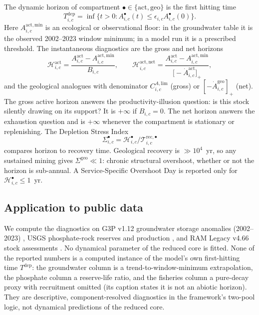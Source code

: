\documentclass[11pt]{article}
\theoremstyle{definition}
\begin{document}
The dynamic horizon of compartment $\bullet\in\{\mathrm{act},\mathrm{geo}\}$ is the first hitting time
\begin{equation}
T^{\mathrm{dep}}_{i,c}=\inf\bigl\{t>0:A^\bullet_{i,c}(t)\le\epsilon_{i,c}A^\bullet_{i,c}(0)\bigr\}.
\end{equation}
Here $A^{\mathrm{act,min}}_{i,c}$ is an ecological or observational floor: in the groundwater table it is the observed 2002--2023 window minimum; in a model run it is a prescribed threshold. The instantaneous diagnostics are the gross and net horizons
\begin{equation}
\mathcal H^{\mathrm{act}}_{i,c}=\frac{A^{\mathrm{act}}_{i,c}-A^{\mathrm{act,min}}_{i,c}}{B_{i,c}},
\qquad
\mathcal H^{\mathrm{act,net}}_{i,c}=\frac{A^{\mathrm{act}}_{i,c}-A^{\mathrm{act,min}}_{i,c}}{\bigl[-\dot A^{\mathrm{act}}_{i,c}\bigr]_+},
\end{equation}
and the geological analogues with denominator $C^{A,\mathrm{lim}}_{i,c}$ (gross) or $[-\dot A^{\mathrm{geo}}_{i,c}]_+$ (net). The gross active horizon answers the productivity-illusion question: is this stock silently drawing on its support? It is $+\infty$ if $B_{i,c}=0$. The net horizon answers the exhaustion question and is $+\infty$ whenever the compartment is stationary or replenishing. The Depletion Stress Index
\begin{equation}
\Sigma^\bullet_{i,c}=\mathcal H^\bullet_{i,c}/\mathcal T^{\mathrm{rec},\bullet}_{i,c}
\end{equation}
compares horizon to recovery time. Geological recovery is $\gg 10^4$~yr, so any sustained mining gives $\Sigma^{\mathrm{geo}}\ll 1$: chronic structural overshoot, whether or not the horizon is sub-annual. A Service-Specific Overshoot Day is reported only for $\mathcal H^\bullet_{i,c}\le 1$~yr.

\subsection{Application to public data}
\label{sec:adh-results}

We compute the diagnostics on G3P v1.12 groundwater storage anomalies (2002--2023) \cite{guentner2024}, USGS phosphate-rock reserves and production \cite{usgsmcs}, and RAM Legacy v4.66 stock assessments \cite{ricard2012}. No dynamical parameter of the reduced core is fitted. None of the reported numbers is a computed instance of the model's own first-hitting time $T^{\mathrm{dep}}$: the groundwater column is a trend-to-window-minimum extrapolation, the phosphate column a reserve-life ratio, and the fisheries column a pure-decay proxy with recruitment omitted (its caption states it is not an abiotic horizon). They are descriptive, component-resolved diagnostics in the framework's two-pool logic, not dynamical predictions of the reduced core.
\end{document}
